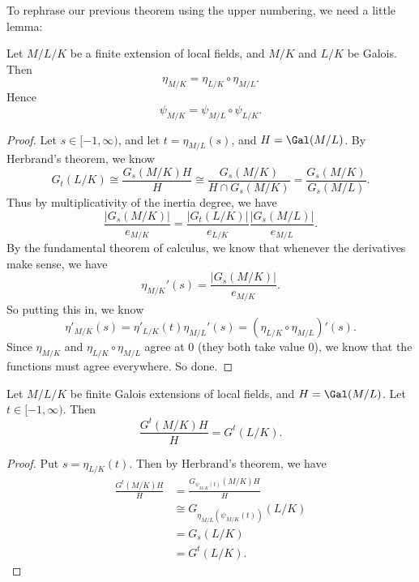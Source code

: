 \documentclass[a4paper]{article}
\begin{document}
To rephrase our previous theorem using the upper numbering, we need a little lemma:
\begin{lemma}
  Let $M/L/K$ be a finite extension of local fields, and $M/K$ and $L/K$ be Galois. Then
  \[
    \eta_{M/K} = \eta_{L/K} \circ \eta_{M/L}.
  \]
  Hence
  \[
    \psi_{M/K} = \psi_{M/L} \circ \psi_{L/K}.
  \]
\end{lemma}

\begin{proof}
  Let $s \in [-1 , \infty)$, and let $t = \eta_{M/L}(s)$, and $H = \Gal(M/L)$. By Herbrand's theorem, we know
  \[
    G_t(L/K) \cong \frac{G_s(M/K)H}{H} \cong \frac{G_s(M/K)}{H\cap G_s(M/K)} = \frac{G_s(M/K)}{G_s(M/L)}.
  \]
  Thus by multiplicativity of the inertia degree, we have
  \[
    \frac{|G_s(M/K)|}{e_{M/K}} = \frac{|G_t(L/K)|}{e_{L/K}} \frac{|G_s(M/L)|}{e_{M/L}}.
  \]
  By the fundamental theorem of calculus, we know that whenever the derivatives make sense, we have
  \[
    \eta_{M/K}'(s) = \frac{|G_s(M/K)|}{e_{M/K}}.
  \]
  So putting this in, we know
  \[
    \eta'_{M/K}(s) = \eta'_{L/K}(t) \eta_{M/L}'(s) = (\eta_{L/K} \circ \eta_{M/L})'(s).
  \]
  Since $\eta_{M/K}$ and $\eta_{L/K} \circ \eta_{M/L}$ agree at $0$ (they both take value $0$), we know that the functions must agree everywhere. So done.
\end{proof}

\begin{cor}
  Let $M/L/K$ be finite Galois extensions of local fields, and $H = \Gal(M/L)$. Let $t \in [-1, \infty)$. Then
  \[
    \frac{G^t(M/K)H}{H} = G^t(L/K).
  \]
\end{cor}

\begin{proof}
  Put $s = \eta_{L/K}(t)$. Then by Herbrand's theorem, we have
  \begin{align*}
    \frac{G^t(M/K)H}{H} &= \frac{G_{\psi_{M/K}(t)}(M/K) H}{H} \\
    &\cong G_{\eta_{M/L}(\psi_{M/K}(t))}(L/K)\\
    &= G_s(L/K)\\
    &= G^t(L/K).
  \end{align*}
\end{proof}
\end{document}
